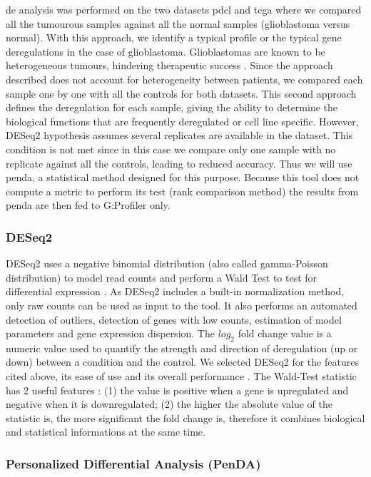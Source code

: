 \acrshort{de} analysis was performed on the two datasets \acrshort{pdcl} and \acrshort{tcga} where we compared all the tumourous samples against all the normal samples (glioblastoma versus normal).
With this approach, we identify a typical profile or the typical gene deregulations in the case of glioblastoma.
Glioblastomas are known to be heterogeneous tumours, hindering therapeutic success \cite*{Neftel2019,Delgado-Lopez2016, Quinones2018}.
Since the approach described does not account for heterogeneity between patients, we compared each sample one by one with all the controls for both datasets.
This second approach defines the deregulation for each sample, giving the ability to determine the biological functions that are frequently deregulated or cell line specific.
However, DESeq2 hypothesis assumes several replicates are available in the dataset.
This condition is not met since in this case we compare only one sample with no replicate against all the controls, leading to reduced accuracy.
Thus we will use \acrshort{penda}, a statistical method designed for this purpose.
Because this tool does not compute a metric to perform its test (rank comparison method) the results from \acrshort{penda} are then fed to G:Profiler only.

\subsubsection{DESeq2}

DESeq2 uses a negative binomial distribution (also called gamma-Poisson distribution) to model read counts and perform a Wald Test to test for differential expression \cite*{Love2014}.
As DESeq2 includes a built-in normalization method, only raw counts can be used as input to the tool.
It also performs an automated detection of outliers, detection of genes with low counts, estimation of model parameters and gene expression dispersion.
The $log_2$ fold change value is a numeric value used to quantify the strength and direction of deregulation (up or down) between a condition and the control.
We selected DESeq2 for the features cited above, its ease of use and its overall performance \cite*{Love2014}.
The Wald-Test statistic has 2 useful features : (1) the value is positive when a gene is upregulated and negative when it is downregulated; (2) the higher the absolute value of the statistic is, the more significant the fold change is, therefore it combines biological and statistical informations at the same time.

\subsubsection{ Personalized Differential Analysis (PenDA)}


